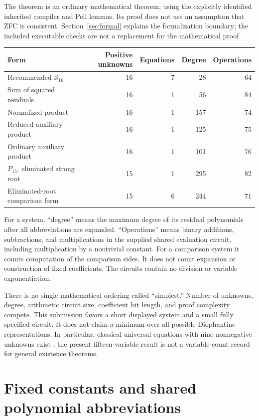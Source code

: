 \documentclass[11pt,a4paper]{article}
\theoremstyle{remark}
\begin{document}
The theorem is an ordinary mathematical theorem, using the explicitly
identified inherited compiler and Pell lemmas. Its proof does not use an
assumption that ZFC is consistent. Section~\ref{sec:formal} explains the
formalization boundary; the included executable checks are not a
replacement for the mathematical proof.

\begin{center}
\begin{tabular}{lrrrr}
\toprule
Form & Positive unknowns & Equations & Degree & Operations\\
\midrule
Recommended $\mathcal S_{16}$ & 16 & 7 & 28 & 64\\
Sum of squared residuals & 16 & 1 & 56 & 84\\
Normalized product & 16 & 1 & 157 & 74\\
Reduced auxiliary product & 16 & 1 & 125 & 75\\
Ordinary auxiliary product & 16 & 1 & 101 & 76\\
$P_{15}$, eliminated strong root & 15 & 1 & 295 & 82\\
Eliminated-root comparison form & 15 & 6 & 244 & 71\\
\bottomrule
\end{tabular}
\end{center}

For a system, ``degree'' means the maximum degree of its residual
polynomials after all abbreviations are expanded. ``Operations'' means
binary additions, subtractions, and multiplications in the supplied
shared evaluation circuit, including multiplication by a nontrivial
constant. For a comparison system it counts computation of the comparison
sides. It does not count expansion or construction of fixed coefficients.
The circuits contain no division or variable exponentiation.

There is no single mathematical ordering called ``simplest.'' Number of
unknowns, degree, arithmetic circuit size, coefficient bit length, and
proof complexity compete. This submission favors a short displayed
system and a small fully specified circuit. It does not claim a minimum
over all possible Diophantine representations. In particular, classical
universal equations with nine nonnegative unknowns exist
\cite{jones1982}; the present fifteen-variable result is not a
variable-count record for general existence theorems.

\section{Fixed constants and shared polynomial abbreviations}
\label{sec:notation}
\end{document}
